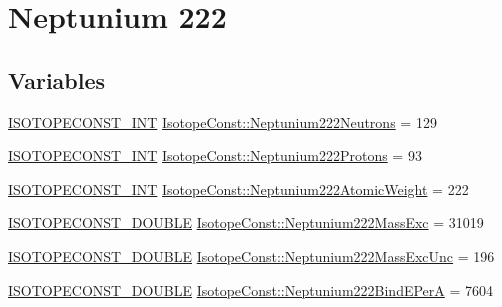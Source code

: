 \hypertarget{group___isotope_const-_neptunium-_np222}{}\section{Neptunium 222}
\label{group___isotope_const-_neptunium-_np222}
\subsection*{Variables}
\begin{DoxyCompactItemize}
\item 
\mbox{\hyperlink{group___isotope_const-_macros_ga5f18360b3e99483a35c32d789e62621c}{I\+S\+O\+T\+O\+P\+E\+C\+O\+N\+S\+T\+\_\+\+I\+NT}} \mbox{\hyperlink{group___isotope_const-_neptunium-_np222_ga33c7014d1e40f2935347b86a2b454bc3}{Isotope\+Const\+::\+Neptunium222\+Neutrons}} = 129
\item 
\mbox{\hyperlink{group___isotope_const-_macros_ga5f18360b3e99483a35c32d789e62621c}{I\+S\+O\+T\+O\+P\+E\+C\+O\+N\+S\+T\+\_\+\+I\+NT}} \mbox{\hyperlink{group___isotope_const-_neptunium-_np222_ga0136ffd2799307b7143ac70f4f63fcd9}{Isotope\+Const\+::\+Neptunium222\+Protons}} = 93
\item 
\mbox{\hyperlink{group___isotope_const-_macros_ga5f18360b3e99483a35c32d789e62621c}{I\+S\+O\+T\+O\+P\+E\+C\+O\+N\+S\+T\+\_\+\+I\+NT}} \mbox{\hyperlink{group___isotope_const-_neptunium-_np222_ga2ff3f43f79df6ee66dc18fd7f9e79426}{Isotope\+Const\+::\+Neptunium222\+Atomic\+Weight}} = 222
\item 
\mbox{\hyperlink{group___isotope_const-_macros_ga8f45a7272ce02c0b4c65c44636ed719a}{I\+S\+O\+T\+O\+P\+E\+C\+O\+N\+S\+T\+\_\+\+D\+O\+U\+B\+LE}} \mbox{\hyperlink{group___isotope_const-_neptunium-_np222_gaef02964f2b8ac6aec340d43e4866d48a}{Isotope\+Const\+::\+Neptunium222\+Mass\+Exc}} = 31019
\item 
\mbox{\hyperlink{group___isotope_const-_macros_ga8f45a7272ce02c0b4c65c44636ed719a}{I\+S\+O\+T\+O\+P\+E\+C\+O\+N\+S\+T\+\_\+\+D\+O\+U\+B\+LE}} \mbox{\hyperlink{group___isotope_const-_neptunium-_np222_ga8cd74d4151a2b87810fe679891c10d28}{Isotope\+Const\+::\+Neptunium222\+Mass\+Exc\+Unc}} = 196
\item 
\mbox{\hyperlink{group___isotope_const-_macros_ga8f45a7272ce02c0b4c65c44636ed719a}{I\+S\+O\+T\+O\+P\+E\+C\+O\+N\+S\+T\+\_\+\+D\+O\+U\+B\+LE}} \mbox{\hyperlink{group___isotope_const-_neptunium-_np222_gaa85ab7c7398ceee386285c4adeb747b1}{Isotope\+Const\+::\+Neptunium222\+Bind\+E\+PerA}} = 7604
\item 

\end{DoxyCompactItemize}
